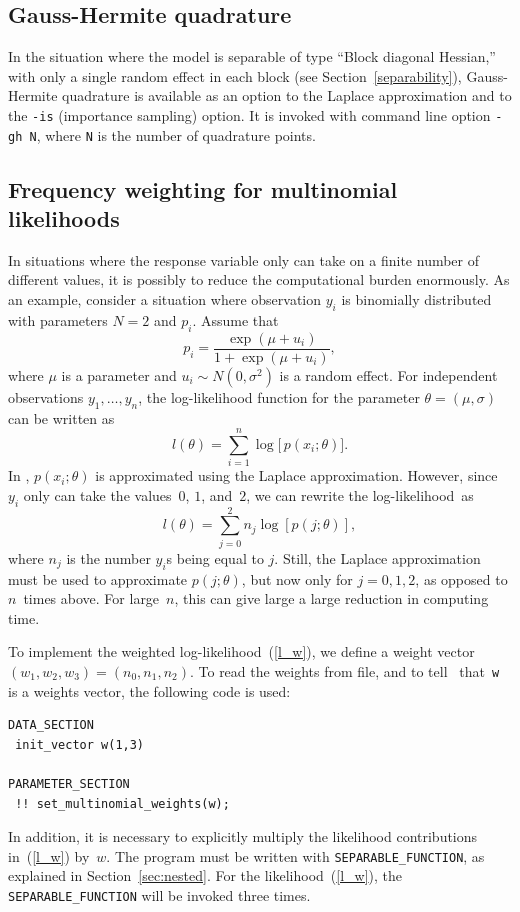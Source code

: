 \documentclass{admbmanual}
\begin{document}
\subsection{Gauss-Hermite quadrature}

In the situation where the model is separable of type ``Block diagonal
Hessian,'' with only a single random effect in each block (see
Section~\ref{separability}), Gauss-Hermite quadrature is available as an option
to the Laplace approximation and to the \texttt{-is} (importance sampling)
option. It is invoked with command line option \texttt{-gh N}, where \texttt{N}
is the number of quadrature points.

\subsection{Frequency weighting for multinomial likelihoods}

In situations where the response variable only can take on a finite number of
different values, it is possibly to reduce the computational burden enormously.
As an example, consider a situation where observation $y_{i}$ is binomially
distributed with parameters $N=2$ and $p_{i}$. Assume that
\begin{equation*}
  p_{i}=\frac{\exp (\mu +u_{i})}{1+\exp (\mu +u_{i})},
\end{equation*}
where $\mu$ is a parameter and $u_{i}\sim N(0,\sigma ^{2})$ is a random effect.
For independent observations $y_1,\ldots,y_n$, the log-likelihood function for
the parameter $\theta =(\mu ,\sigma )$ can be written as
\begin{equation}
  l(\theta )=\sum_{i=1}^{n}\log \bigl[\, p(x_{i};\theta )\bigr] .
\end{equation}
In \scAR, $p(x_{i};\theta)$ is approximated using the Laplace approximation.
However, since $y_i$ only can take the values~$0$, $1$, and~$2$, we can rewrite
the log-likelihood~as
$$
l(\theta )=\sum_{j=0}^{2}n_{j}\log \left[ p(j;\theta )\right],
$$
where $n_j$ is the number $y_i$s being equal to $j$. Still, the Laplace
approximation must be used to approximate $p(j;\theta )$, but now only for
$j=0,1,2$, as opposed to $n$~times above. For large~$n$, this can give large a
large reduction in computing time.

To implement the weighted log-likelihood~(\ref{l_w}), we define a weight vector
$(w_1,w_2,w_3)=(n_{0},n_{1},n_{2})$. To read the weights from file, and to tell
\scAR\ that~\texttt{w} is a weights vector, the following code is used:
\begin{lstlisting}
DATA_SECTION
 init_vector w(1,3)

PARAMETER_SECTION
 !! set_multinomial_weights(w);
\end{lstlisting}
In addition, it is necessary to explicitly multiply the likelihood contributions
in~(\ref{l_w}) by~$w$. The program must be written with
\texttt{SEPARABLE\_FUNCTION}, as explained in Section~\ref{sec:nested}. For the
likelihood~(\ref{l_w}), the \texttt{SEPARABLE\_FUNCTION} will be invoked three
times.
\end{document}
